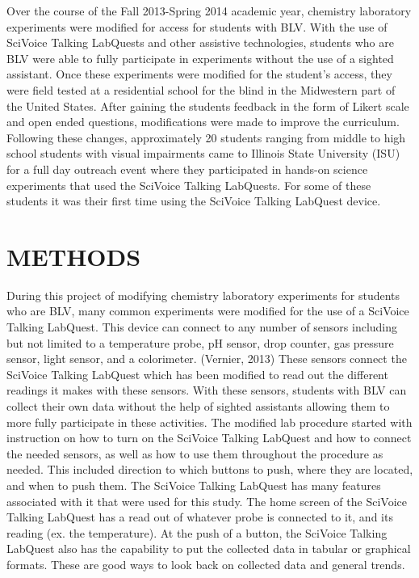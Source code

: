 \documentclass[11.5pt]{sig-alternate} %
\begin{document}
\begin{large}
Over the course of the Fall 2013-Spring 2014 academic year, chemistry laboratory experiments were modified for access for students with BLV. With the use of SciVoice Talking LabQuests and other assistive technologies, students who are BLV were able to fully participate in experiments without the use of a sighted assistant. Once these experiments were modified for the student’s access, they were field tested at a residential school for the blind in the Midwestern part of the United States. After gaining the students feedback in the form of Likert scale and open ended questions, modifications were made to improve the curriculum. Following these changes, approximately 20 students ranging from middle to high school students with visual impairments came to Illinois State University (ISU) for a full day outreach event where they participated in hands-on science experiments that used the SciVoice Talking LabQuests. For some of these students it was their first time using the SciVoice Talking LabQuest device. 

\section*{METHODS}

During this project of modifying chemistry laboratory experiments for students who are BLV, many common experiments were modified for the use of a SciVoice Talking LabQuest. This device can connect to any number of sensors including but not limited to a temperature probe, pH sensor, drop counter, gas pressure sensor, light sensor, and a colorimeter. (Vernier, 2013)  These sensors connect the SciVoice Talking LabQuest which has been modified to read out the different readings it makes with these sensors. With these sensors, students with BLV can collect their own data without the help of sighted assistants allowing them to more fully participate in these activities. The modified lab procedure started with instruction on how to turn on the SciVoice Talking LabQuest and how to connect the needed sensors, as well as how to use them throughout the procedure as needed. This included direction to which buttons to push, where they are located, and when to push them. The SciVoice Talking LabQuest has many features associated with it that were used for this study. The home screen of the SciVoice Talking LabQuest has a read out of whatever probe is connected to it, and its reading (ex. the temperature). At the push of a button, the SciVoice Talking LabQuest also has the capability to put the collected data in tabular or graphical formats. These are good ways to look back on collected data and general trends. 


\end{large}
\end{document}
